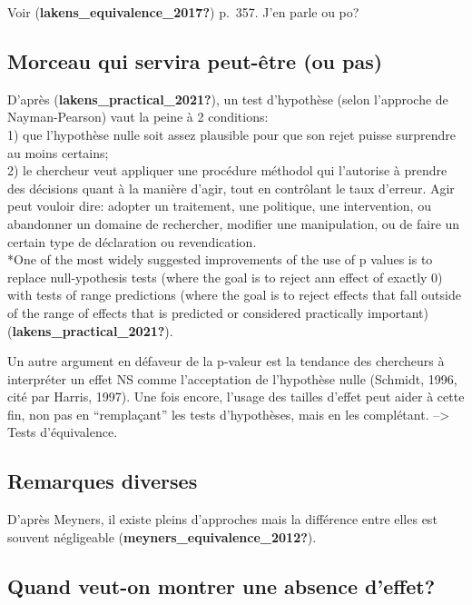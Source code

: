 \documentclass[
  english,
  man]{apa6}
\begin{document}
Voir (\textbf{lakens\_equivalence\_2017?}) p.~357. J'en parle ou po?

\hypertarget{morceau-qui-servira-peut-uxeatre-ou-pas}{%
\subsection{Morceau qui servira peut-être (ou pas)}\label{morceau-qui-servira-peut-uxeatre-ou-pas}}

D'après (\textbf{lakens\_practical\_2021?}), un test d'hypothèse (selon l'approche de Nayman-Pearson) vaut la peine à 2 conditions:\\
1) que l'hypothèse nulle soit assez plausible pour que son rejet puisse surprendre au moins certains;\\
2) le chercheur veut appliquer une procédure méthodol qui l'autorise à prendre des décisions quant à la manière d'agir, tout en contrôlant le taux d'erreur. Agir peut vouloir dire: adopter un traitement, une politique, une intervention, ou abandonner un domaine de rechercher, modifier une manipulation, ou de faire un certain type de déclaration ou revendication.\\
*One of the most widely suggested improvements of the use of p values is to replace null-ypothesis tests (where the goal is to reject ann effect of exactly 0) with tests of range predictions (where the goal is to reject effects that fall outside of the range of effects that is predicted or considered practically important) (\textbf{lakens\_practical\_2021?}).

Un autre argument en défaveur de la p-valeur est la tendance des chercheurs à interpréter un effet NS comme l'acceptation de l'hypothèse nulle (Schmidt, 1996, cité par Harris, 1997). Une fois encore, l'usage des tailles d'effet peut aider à cette fin, non pas en ``remplaçant'' les tests d'hypothèses, mais en les complétant. --\textgreater{} Tests d'équivalence.

\hypertarget{remarques-diverses}{%
\subsection{Remarques diverses}\label{remarques-diverses}}

D'après Meyners, il existe pleins d'approches mais la différence entre elles est souvent négligeable (\textbf{meyners\_equivalence\_2012?}).

\hypertarget{quand-veut-on-montrer-une-absence-deffet}{%
\subsection{Quand veut-on montrer une absence d'effet?}\label{quand-veut-on-montrer-une-absence-deffet}}
\end{document}
